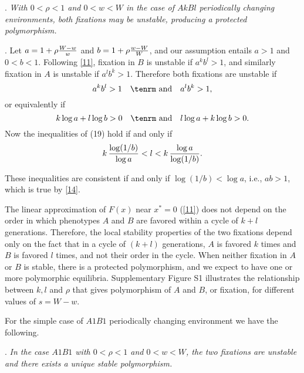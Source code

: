 \documentclass[9pt,twocolumn,twoside,lineno]{pnas-new}
\begin{document}
. {\sl With $0<\rho<1$ and $0<w<W$ in the case of $AkBl$ periodically changing environments, both fixations may be unstable, producing a protected polymorphism.}\par
\medskip

. Let $a=1+\rho{W-w\over w}$ and $b=1+\rho{w-W\over W}$, and our assumption entails  $a>1$ and $0<b<1$. Following \eqref{11}, fixation in $B$ is unstable if $a^kb^l>1$, and similarly  fixation in $A$ is unstable if $a^lb^k>1$. Therefore both fixations are unstable if
\begin{equation}a^kb^l>1\quad\hbox{\tenrm and}\quad a^lb^k>1,\label{18}\end{equation}
or equivalently if
\begin{equation}k\log a +l\log b>0\quad\hbox{\tenrm and}\quad l\log a+k\log b>0.\label{19}\end{equation}
Now the inequalities of (19) hold if and only if
\begin{equation}k\,{\log(1/b)\over\log a} < l < k\,{\log a\over\log(1/b)}.\label{20}\end{equation} 

These inequalities are consistent if and only if $\log(1/b)<\log a$, i.e., $ab>1$, which is true by \eqref{14}.

The linear approximation of $F(x)$ near $x^*=0$ (\eqref{11}) does not depend on the order in which phenotypes $A$ and $B$ are favored within a cycle of $k+l$ generations.
Therefore, the local stability properties of the two fixations depend only on the fact that in a cycle of $(k+l)$ generations, $A$ is favored $k$ times and $B$ is favored $l$ times, and not their order in the cycle. 
When neither fixation in $A$ or $B$ is stable, there is a protected polymorphism, and we expect to have one or more polymorphic equilibria. Supplementary Figure S1 illustrates the relationship between $k,l$ and $\rho$ that gives polymorphism of $A$ and $B$, or fixation, for different values of $s=W-w$. 

For the simple case of $A1B1$ periodically changing environment we have the following.
\medskip

. {\sl In the case $A1B1$ with $0<\rho<1$ and $0<w<W$, the two fixations are unstable and there exists a unique stable polymorphism.}\par
\medskip
\end{document}
